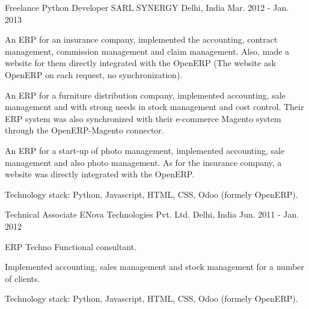 \begin{cventries}
  \cventry
    {Freelance Python Developer} %
    {SARL SYNERGY} %
    {Delhi, India} %
    {Mar. 2012 - Jan. 2013} %
    {
      \begin{cvitems} %
        \item {An ERP for an insurance company, implemented the accounting, contract management, commission management and claim management. Also, made a website for them directly integrated with the OpenERP (The website ask OpenERP on each request, no synchronization).}
        \item {An ERP for a furniture distribution company, implemented accounting, sale management and with strong needs in stock management and cost control. Their ERP system was also synchronized with their e-commerce Magento system through the OpenERP-Magento connector.}
        \item {An ERP for a start-up of photo management, implemented accounting, sale management and also photo management. As for the insurance company, a website was directly integrated with the OpenERP.}
        \item {Technology stack: Python, Javascript, HTML, CSS, Odoo (formely OpenERP).}
      \end{cvitems}
    }

  \cventry
    {Technical Associate} %
    {ENova Technologies Pvt. Ltd.} %
    {Delhi, India} %
    {Jun. 2011 - Jan. 2012} %
    {
      \begin{cvitems} %
        \item {ERP Techno Functional consultant.}
        \item {Implemented accounting, sales management and stock management for a number of clients.}
        \item {Technology stack: Python, Javascript, HTML, CSS, Odoo (formely OpenERP).}
      \end{cvitems}
    }

\end{cventries}
